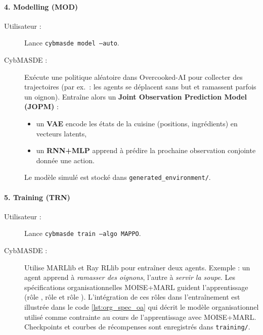 \paragraph{4. Modelling (MOD)}
\begin{description}
  \item[Utilisateur :] Lance \texttt{cybmasde model --auto}.
  \item[CybMASDE :] Exécute une politique aléatoire dans Overcooked-AI pour collecter des trajectoires (par ex.~: les agents se déplacent sans but et ramassent parfois un oignon).
    Entraîne alors un \textbf{Joint Observation Prediction Model (JOPM)} :
    \begin{itemize}
      \item un \textbf{VAE} encode les états de la cuisine (positions, ingrédients) en vecteurs latents,
      \item un \textbf{RNN+MLP} apprend à prédire la prochaine observation conjointe donnée une action.
    \end{itemize}
    Le modèle simulé est stocké dans \texttt{generated\_environment/}.
\end{description}

\paragraph{5. Training (TRN)}
\begin{description}
  \item[Utilisateur :] Lance \texttt{cybmasde train --algo MAPPO}.
  \item[CybMASDE :] Utilise MARLlib et Ray RLlib pour entraîner deux agents.
    Exemple : un agent apprend à \textit{ramasser des oignons}, l’autre à \textit{servir la soupe}.
    Les spécifications organisationnelles MOISE+MARL guident l’apprentissage (rôle , rôle  et rôle ). L'intégration de ces rôles dans l'entraînement est illustrée dans le code \autoref{lst:org_spec_oa} qui décrit le modèle organisationnel utilisé comme contrainte au cours de l'apprentissage avec MOISE+MARL.
    Checkpoints et courbes de récompenses sont enregistrés dans \texttt{training/}.
\end{description}

